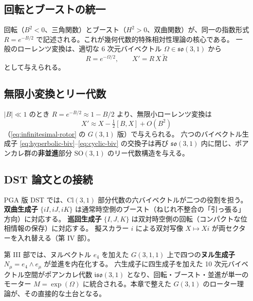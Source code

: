 \documentclass[dvipdfmx,a4paper,oneside]{jsbook}
\numberwithin{equation}{chapter}
\begin{document}
\subsection{回転とブーストの統一}

回転（\(B^2 < 0\)、三角関数）とブースト（\(H^2 > 0\)、双曲関数）が、同一の指数形式 \(R = e^{-B/2}\) で記述される。これが幾何代数的特殊相対性理論の核心である。
一般のローレンツ変換は、適切な 6 次元バイベクトル \(\Omega \in \mathfrak{so}(3,1)\) から
\begin{equation}
  R = e^{-\Omega/2}, \qquad X' = R\,X\,\widetilde{R}
  \label{eq:general-lorentz}
\end{equation}
として与えられる。

\subsection{無限小変換とリー代数}

\(|B| \ll 1\) のとき \(R = e^{-B/2} \approx 1 - B/2\) より、無限小ローレンツ変換は
\begin{equation}
  X' \approx X - \tfrac{1}{2}[B, X] + O(B^2)
  \label{eq:infinitesimal-lorentz}
\end{equation}
（\eqref{eq:infinitesimal-rotor} の \(G(3,1)\) 版）で与えられる。
六つのバイベクトル生成子 \eqref{eq:hyperbolic-biv}–\eqref{eq:cyclic-biv} の交換子は再び \(\mathfrak{so}(3,1)\) 内に閉じ、ポアンカレ群の\textbf{非並進}部分 \(\mathrm{SO}(3,1)\) のリー代数構造を与える。

\subsection{DST 論文との接続}

PGA 版 DST では、\(\mathrm{Cl}(3,1)\) 部分代数の六バイベクトルが二つの役割を担う。
\textbf{双曲生成子} \(\{iI,iJ,iK\}\) は通常時空側のブースト（ねじれ不整合の「引っ張る」方向）に対応する。
\textbf{巡回生成子} \(\{I,J,K\}\) は双対時空側の回転（コンパクトな位相情報の保存）に対応する。
擬スカラー \(i\) による双対写像 \(X \mapsto Xi\) が両セクターを入れ替える（第 IV 部）。

第 III 部では、ヌルベクトル \(e_4\) を加えた \(G(3,1,1)\) 上で四つの\textbf{ヌル生成子} \(N_\mu = e_4 \wedge e_\mu\) が並進を内在化する。
六生成子に四生成子を加えた 10 次元バイベクトル空間がポアンカレ代数 \(\mathfrak{iso}(3,1)\) となり、回転・ブースト・並進が単一のモーター \(M = \exp(\Omega)\) に統合される。本章で整えた \(G(3,1)\) のローター理論が、その直接的な土台となる。
\end{document}
